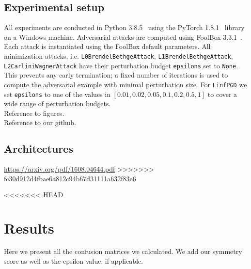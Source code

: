 \documentclass{article}
\begin{document}
\subsection{Experimental setup}
All experiments are conducted in Python 3.8.5~\cite{van1995python} using the PyTorch 1.8.1~\cite{pytorch} library on a Windows machine. Adversarial attacks are computed using FoolBox 3.3.1~\cite{rauber2017foolbox}. Each attack is instantiated using the FoolBox default parameters. All minimization attacks, i.e. \texttt{L0BrendelBethgeAttack}, \texttt{L1BrendelBethgeAttack}, \texttt{L2CarliniWagnerAttack} have their perturbation budget \texttt{epsilons} set to \texttt{None}. This prevents any early termination; a fixed number of iterations is used to compute the adversarial example with minimal perturbation size. For \texttt{LinfPGD} we set \texttt{epsilons} to one of the values in $[0.01, 0.02, 0.05, 0.1, 0.2, 0.5, 1]$ to cover a wide range of perturbation budgets.\\

\noindent Reference to figures.\\
Reference to our github.

\subsection{Architectures}
\url{https://arxiv.org/pdf/1608.04644.pdf}
>>>>>>> fc30d912d4fbae6a812c94b67d31111a632f83e6

<<<<<<< HEAD
\section{Results}
\label{sec:results}
Here we present all the confusion matrices we calculated. We add our symmetry score as well as the epsilon value, if applicable.
\end{document}
